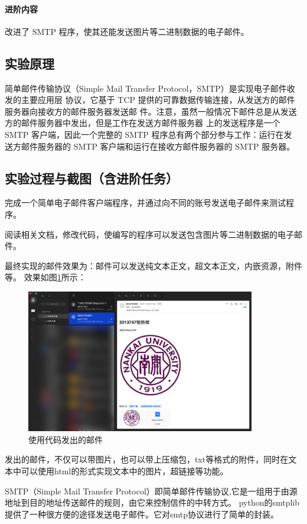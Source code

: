 \documentclass[a4paper,12pt]{report}
\begin{document}
\begin{spacing}{1.5}
\paragraph*{进阶内容}
改进了 SMTP 程序，使其还能发送图片等二进制数据的电子邮件。

\subsection{实验原理}
简单邮件传输协议（Simple Mail Transfer Protocol，SMTP）是实现电子邮件收发的主要应用层 协议，它基于 TCP 提供的可靠数据传输连接，从发送方的邮件服务器向接收方的邮件服务器发送邮 件。注意，虽然一般情况下邮件总是从发送方的邮件服务器中发出，但是工作在发送方邮件服务器 上的发送程序是一个 SMTP 客户端，因此一个完整的 SMTP 程序总有两个部分参与工作：运行在发 送方邮件服务器的 SMTP 客户端和运行在接收方邮件服务器的 SMTP 服务器。

\subsection{实验过程与截图（含进阶任务）}
完成一个简单电子邮件客户端程序，并通过向不同的账号发送电子邮件来测试程序。

阅读相关文档，修改代码，使编写的程序可以发送包含图片等二进制数据的电子邮件。

最终实现的邮件效果为：邮件可以发送纯文本正文，超文本正文，内嵌资源，附件等。
效果如图\ref{smtp}所示：
\begin{figure}[H]
  \centering
\includegraphics[width=10cm]{figure/smtp.png}
\caption{使用代码发出的邮件}
\label{smtp}
\end{figure}
发出的邮件，不仅可以带图片，也可以带上压缩包，txt等格式的附件，同时在文本中可以使用html的形式实现文本中的图片，超链接等功能。

SMTP（Simple Mail Transfer Protocol）即简单邮件传输协议,它是一组用于由源地址到目的地址传送邮件的规则，由它来控制信件的中转方式。
python的smtplib提供了一种很方便的途径发送电子邮件。它对smtp协议进行了简单的封装。


\end{spacing}
\end{document}
